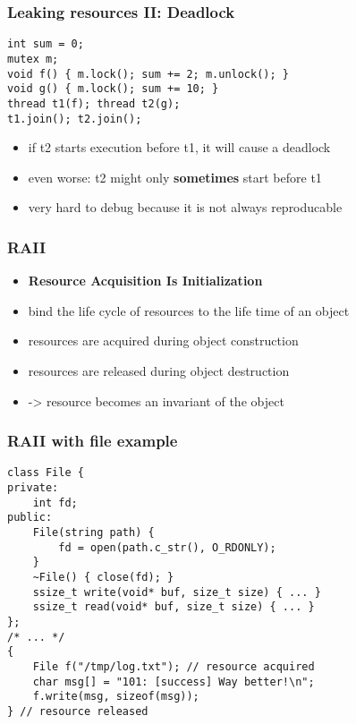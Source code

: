 \begin{frame}[fragile]
    \frametitle{Leaking resources II: Deadlock}
    \begin{lstlisting}[numbers=none]
int sum = 0;
mutex m;
void f() { m.lock(); sum += 2; m.unlock(); }
void g() { m.lock(); sum += 10; }
thread t1(f); thread t2(g); 
t1.join(); t2.join();
    \end{lstlisting}
    \begin{itemize}
    \item if t2 starts execution before t1, it will cause a deadlock
    \item even worse: t2 might only \textbf{sometimes} start before t1
    \item very hard to debug because it is not always reproducable
    \end{itemize}
\end{frame}

\begin{frame}[fragile]
    \frametitle{RAII}
    \begin{itemize}
    \item \textbf{Resource Acquisition Is Initialization}
    \item bind the life cycle of resources to the life time of an object
    \item resources are acquired during object construction
    \item resources are released during object destruction
    \item -> resource becomes an invariant of the object
    \end{itemize}
\end{frame}

\begin{frame}[fragile]
    \frametitle{RAII with file example}
    \begin{lstlisting}[numbers=none]
class File {
private:
    int fd;
public:
    File(string path) {
        fd = open(path.c_str(), O_RDONLY);
    }
    ~File() { close(fd); }
    ssize_t write(void* buf, size_t size) { ... }
    ssize_t read(void* buf, size_t size) { ... }
};
/* ... */
{
    File f("/tmp/log.txt"); // resource acquired
    char msg[] = "101: [success] Way better!\n";
    f.write(msg, sizeof(msg));
} // resource released
    \end{lstlisting}
\end{frame}

